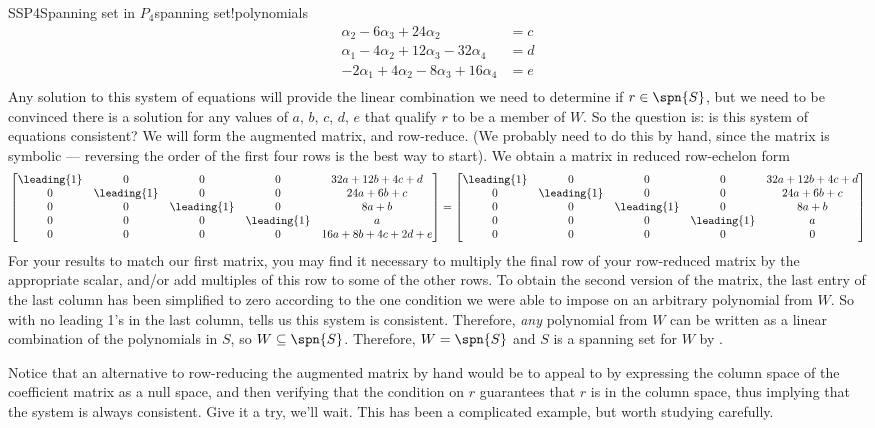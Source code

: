 \begin{example}{SSP4}{Spanning set in $P_4$}{spanning set!polynomials}
\begin{align*}
\alpha_2-6\alpha_3+24\alpha_2&=c\\
\alpha_1-4\alpha_2+12\alpha_3-32\alpha_4&=d\\
-2\alpha_1+4\alpha_2-8\alpha_3+16\alpha_4&=e\\
\end{align*}
%
Any solution to this system of equations will provide the linear combination we need to determine if $r\in\spn{S}$, but we need to be convinced there is a solution for any values of $a,\,b,\,c,\,d,\,e$ that qualify $r$ to be a member of $W$.  So the question is:  is this system of equations consistent?  We will form the augmented matrix, and row-reduce. (We probably need to do this by hand, since the matrix is symbolic --- reversing the order of the first four rows is the best way to start).  We obtain a matrix in reduced row-echelon form
%
\begin{equation*}
\begin{bmatrix}
\leading{1}&0&0&0&32a+12b+4c+d\\
0&\leading{1}&0&0&24a+6b+c\\
0&0&\leading{1}&0&8a+b\\
0&0&0&\leading{1}&a\\
0&0&0&0&16a+8b+4c+2d+e
\end{bmatrix}
=
\begin{bmatrix}
\leading{1}&0&0&0&32a+12b+4c+d\\
0&\leading{1}&0&0&24a+6b+c\\
0&0&\leading{1}&0&8a+b\\
0&0&0&\leading{1}&a\\
0&0&0&0&0
\end{bmatrix}
\end{equation*}
%
For your results to match our first matrix, you may find it necessary to multiply the final row of your row-reduced matrix by the appropriate scalar, and/or add multiples of this row to some of the other rows.  To obtain the second version of the matrix, the last entry of the last column has been simplified to zero according to the one condition we were able to impose on an arbitrary polynomial from $W$.    So with no leading 1's in the last column,  tells us this system is consistent.  Therefore, {\em any} polynomial from $W$ can be written as a linear combination of the polynomials in $S$, so $W\subseteq\spn{S}$. Therefore,  $W=\spn{S}$ and $S$ is a spanning set for $W$ by .\par
%
Notice that an alternative to row-reducing the augmented matrix by hand would be to appeal to  by expressing the column space of the coefficient matrix as a null space, and then verifying that the condition on $r$ guarantees that $r$ is in the column space, thus implying that the system is always consistent.  Give it a try, we'll wait.  This has been a complicated example, but worth studying carefully.
\end{example}
